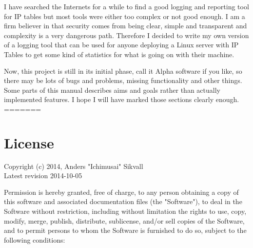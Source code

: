 \documentclass[english,twoside,openright,a4paper,12pt]{article}
\begin{document}
I have searched the Internets for a while to find a good logging and reporting tool for IP tables but most tools were either too complex or not good enough. I am a firm believer in that security comes from being clear, simple and transparent and complexity is a very dangerous path. Therefore I decided to write my own version of a logging tool that can be used for anyone deploying a Linux server with IP Tables to get some kind of statistics for what is going on with their machine. 
 
Now, this project is still in its initial phase, call it Alpha software if you like, so there may be lots of bugs and problems, missing functionality and other things. Some parts of this manual describes aims and goals rather than actually implemented features. I hope I will have marked those sections clearly enough. 
=======
\setlength{\parindent}{0pt}
\setlength{\parskip}{1em}

\lhead{\nouppercase{\leftmark}}
\rhead{\nouppercase{\rightmark}}

\pagestyle{fancy}


\newpage
\section*{License}
\label{license}

Copyright (c) 2014, Anders "Ichimusai" Sikvall\\
Latest revision 2014-10-05
 
Permission is hereby granted, free of charge, to any person obtaining a copy of this software and associated documentation files (the "Software"), to deal in the Software without restriction, including without limitation the rights to use, copy, modify, merge, publish, distribute, sublicense, and/or sell copies of the Software, and to permit persons to whom the Software is furnished to do so, subject to the following conditions:
\end{document}
